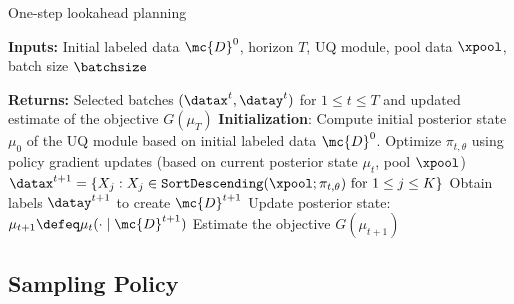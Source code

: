 


 



\begin{algorithm}[t]
 \caption{ One-step lookahead planning}\label{alg:complete}
 \begin{algorithmic}[1] 
 \State \textbf{Inputs:} Initial labeled data $\mc{D}^0$, horizon $T$, UQ module,  pool data  $\xpool$,  batch size $\batchsize$
 
\noindent \textbf{Returns:} %
  Selected batches $(\datax^t, \datay^t)$ for $1 \le t \le T$
 and updated estimate of the objective $G(\mu_{T})$
 \State \textbf{Initialization}: Compute initial posterior state $\mu_0$ of the UQ module based 
 on initial labeled data $\mc{D}^0$.
\State Optimize $\pi_{t,\theta}$ using policy gradient updates  (based on  current posterior state $\mu_t$, pool  $\xpool$)
\State $\datax^{t+1} = \{X_j : X_j \in \texttt{SortDescending}(\xpool; \pi_{t,\theta}) \text{ for } 1\le j \le K \}$ 
\State Obtain labels $\datay^{t+1}$ to create $\mc{D}^{t+1}$
\State Update posterior state: $\mu_{t+1} \defeq \mu_t(\cdot\mid \mc{D}^{t+1})$
\State Estimate the objective $G(\mu_{t+1})$
\EndFor
 \end{algorithmic}
\end{algorithm}
\subsection{Sampling Policy}
\label{sec:k-subset}


